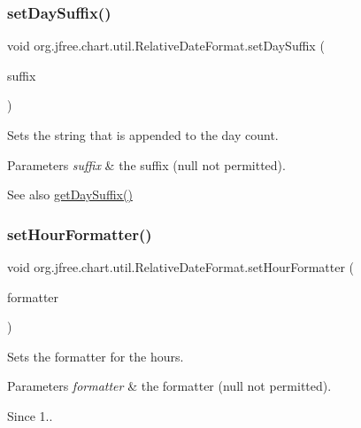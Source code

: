 \subsubsection{\texorpdfstring{set\+Day\+Suffix()}{setDaySuffix()}}
{\footnotesize\ttfamily void org.\+jfree.\+chart.\+util.\+Relative\+Date\+Format.\+set\+Day\+Suffix (\begin{DoxyParamCaption}\item[{String}]{suffix }\end{DoxyParamCaption})}

Sets the string that is appended to the day count.


\begin{DoxyParams}{Parameters}
{\em suffix} & the suffix ({\ttfamily null} not permitted).\\
\hline
\end{DoxyParams}
\begin{DoxySeeAlso}{See also}
\mbox{\hyperlink{classorg_1_1jfree_1_1chart_1_1util_1_1_relative_date_format_a5f84a554de33a518de2257c9bc00128c}{get\+Day\+Suffix()}} 
\end{DoxySeeAlso}
\mbox{\label{classorg_1_1jfree_1_1chart_1_1util_1_1_relative_date_format_a86b86b17869735b9fa80d1b6f4315601}} 
\subsubsection{\texorpdfstring{set\+Hour\+Formatter()}{setHourFormatter()}}
{\footnotesize\ttfamily void org.\+jfree.\+chart.\+util.\+Relative\+Date\+Format.\+set\+Hour\+Formatter (\begin{DoxyParamCaption}\item[{Number\+Format}]{formatter }\end{DoxyParamCaption})}

Sets the formatter for the hours.


\begin{DoxyParams}{Parameters}
{\em formatter} & the formatter ({\ttfamily null} not permitted).\\
\hline
\end{DoxyParams}
\begin{DoxySince}{Since}
1.. 
\end{DoxySince}
\mbox{\label{classorg_1_1jfree_1_1chart_1_1util_1_1_relative_date_format_a3da1b648d57154883d335a57e01b43bd}} 
